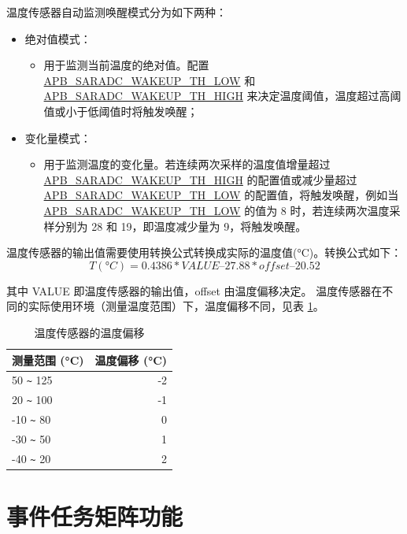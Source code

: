 \documentclass[main\_\_CN.tex]{subfiles}
\begin{document}
温度传感器自动监测唤醒模式分为如下两种：
   \begin{itemize}
       \item 绝对值模式：
           \begin{itemize}
                \item 用于监测当前温度的绝对值。配置 \hyperref[fielddesc:APBSARADCWAKEUPTHLOW]{APB\_SARADC\_WAKEUP\_TH\_LOW} 和 \hyperref[fielddesc:APBSARADCWAKEUPTHHIGH]{APB\_SARADC\_WAKEUP\_TH\_HIGH} 来决定温度阈值，温度超过高阈值或小于低阈值时将触发唤醒；
           \end{itemize}
       \item 变化量模式：
            \begin{itemize}
                \item 用于监测温度的变化量。若连续两次采样的温度值增量超过 \hyperref[fielddesc:APBSARADCWAKEUPTHHIGH]{APB\_SARADC\_WAKEUP\_TH\_HIGH} 的配置值或减少量超过 \hyperref[fielddesc:APBSARADCWAKEUPTHLOW]{APB\_SARADC\_WAKEUP\_TH\_LOW} 的配置值，将触发唤醒，例如当 \hyperref[fielddesc:APBSARADCWAKEUPTHLOW]{APB\_SARADC\_WAKEUP\_TH\_LOW} 的值为 8 时，若连续两次温度采样分别为 28 和 19，即温度减少量为 9，将触发唤醒。
            \end{itemize}
    \end{itemize}

温度传感器的输出值需要使用转换公式转换成实际的温度值(°C)。转换公式如下： 
\[
        T(°C) = 0.4386 * VALUE – 27.88 * offset – 20.52
\]


其中 VALUE 即温度传感器的输出值，offset 由温度偏移决定。 温度传感器在不同的实际使用环境（测量温度范围）下，温度偏移不同，见表 \ref{tab:tsensor-dac}。

\begin{longtable}[c]{|p{4cm}|r|}
    \caption{温度传感器的温度偏移}
    \label{tab:tsensor-dac}
    \\\hline
    \rowcolor{lightgray}
    测量范围 (°C)  & 温度偏移 (°C) \\\hline
    50 \verb+~+ 125 & -2 \\\hline
    20 \verb+~+ 100 & -1 \\\hline
    -10 \verb+~+ 80 & 0 \\\hline
    -30 \verb+~+ 50 & 1 \\\hline
    -40 \verb+~+ 20 & 2 \\\hline
\end{longtable}


\section{事件任务矩阵功能}
\label{sec:sensor-etm-func}
\end{document}

